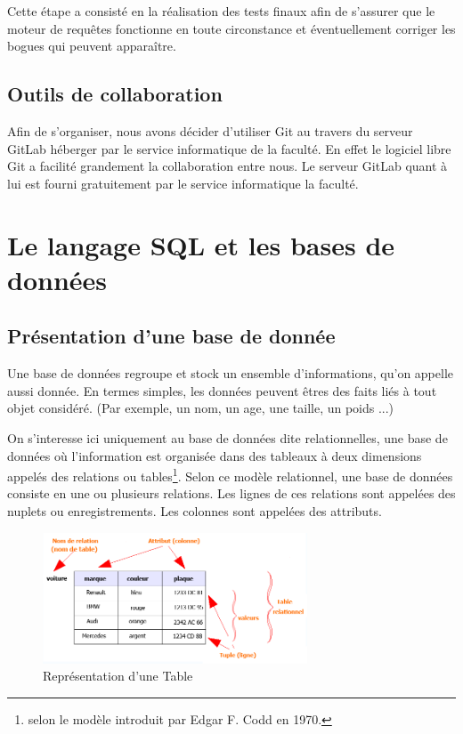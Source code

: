 \documentclass[oneside,13pt,a4paper]{report}
\begin{document}
Cette étape a consisté en la réalisation des tests finaux afin de s’assurer que le moteur de requêtes fonctionne en toute circonstance et éventuellement corriger les bogues qui peuvent apparaître.

\section{Outils de collaboration}

Afin de s’organiser, nous avons décider d’utiliser Git au travers du serveur GitLab héberger par le service informatique de la faculté. En effet le logiciel libre Git a facilité grandement la collaboration entre nous. Le serveur GitLab quant à lui est fourni gratuitement par le service informatique la faculté.


\chapter{Le langage SQL et les bases de données}


\section{Présentation d’une base de donnée}

Une base de données regroupe et stock un ensemble d’informations, qu'on appelle aussi donnée.
En termes simples, les données peuvent êtres des faits liés à tout objet considéré.
(Par exemple, un nom, un age, une taille, un poids ...)

On s'interesse ici uniquement au base de données dite relationnelles, une base de données où l'information est organisée dans des tableaux à deux dimensions appelés des relations ou tables\footnote{ selon le modèle introduit par Edgar F. Codd en 1970.}.
Selon ce modèle relationnel, une base de données consiste en une ou plusieurs relations. Les lignes de ces relations sont appelées des nuplets ou enregistrements. Les colonnes sont appelées des attributs.

\begin{figure}[h]
	\centering
	\includegraphics[width=0.7\textwidth]{img/table_relationnel.png}
	\caption{Représentation d'une Table}
\end{figure}
\end{document}
